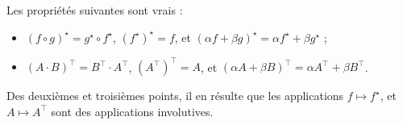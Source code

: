 Les propriétés suivantes sont vrais :
\begin{itemize}
	\item $(f  \circ g)^\star  = g^\star \circ f^\star$, \quad $(f^\star)^\star = f$, \quad et \quad $(\alpha f + \beta g)^\star  = \alpha f^\star + \beta g^\star $\/ ;
	\item $(A\cdot B)^\top  = B^\top \cdot A^\top$, \quad $(A^\top)^\top = A$, \quad et \quad $(\alpha A + \beta B)^\top = \alpha A^\top+ \beta B^\top $.
\end{itemize}
Des deuxièmes et troisièmes points,  il en résulte que les applications $f \mapsto f^\star$, et $A \mapsto A^\top$\/ sont des applications involutives.



